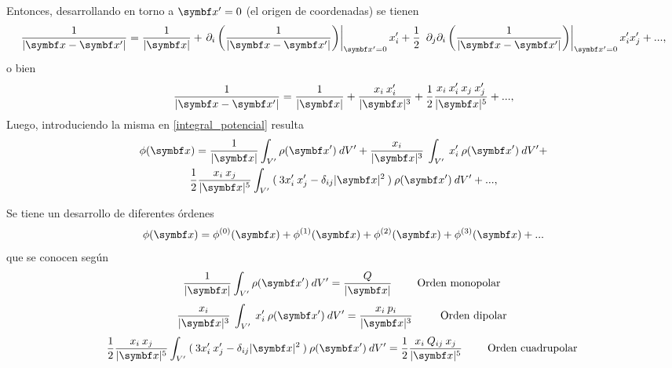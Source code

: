 \documentclass[10pt,oneside]{CBFT_book}
\begin{document}

Entonces, desarrollando en torno a $\vbx'=0$ (el origen de coordenadas) se tienen
\[
	\frac{ 1 }{| \vbx -\vbx' | } = 
	\frac{ 1 }{| \vbx |} + \left.\partial_i \left( \frac{ 1 }{| \vbx -\vbx' | } \right)\right|_{\vbx'=0} x_i' +
	\frac{1}{2} \: \left. \partial_j \partial_i \left( \frac{ 1 }{| \vbx -\vbx' | } \right)\right|_{\vbx'=0} x_i' x_j' + ...,
\]
o bien 
\[
	\frac{ 1 }{| \vbx -\vbx' | } = 
	\frac{ 1 }{| \vbx |} + \frac{x_i \: x_i'}{| \vbx |^3} +
	\frac{1}{2} \frac{ x_i \: x_i' \: x_j \: x_j' }{ | \vbx |^5 } + ...,	
\]
Luego, introduciendo la misma en \eqref{integral_potencial} resulta
\begin{multline*}
 	\phi(\vb{x}) =
	\frac{ 1 }{| \vbx |} \int_{V'} \rho( \vbx' ) \: dV' + 
	\frac{x_i }{| \vbx |^3} \: \int_{V'} \: x_i' \: \rho( \vbx' ) \: dV' + \\
	\frac{1}{2} \frac{ x_i  \: x_j  }{ | \vbx |^5 } 
	\int_{V'} \: (\: 3 x_i' \: x_j' - \delta_{ij}|\vbx|^2 \:) \: \rho( \vbx' ) \: dV' + ...,
\end{multline*}

Se tiene un desarrollo de diferentes órdenes 
\[
	\phi(\vb{x}) = \phi^{(0)}(\vbx) + \phi^{(1)}(\vbx) + \phi^{(2)}(\vbx) + \phi^{(3)}(\vbx) + ...
\]
que se conocen según
\[
	\frac{ 1 }{| \vbx |} \int_{V'} \rho( \vbx' ) \: dV' = \frac{ Q }{| \vbx |} \qquad \text{ Orden monopolar }
\]
\[
	\frac{x_i }{| \vbx |^3} \: \int_{V'} \: x_i' \: \rho( \vbx' ) \: dV' = 
	\frac{x_i \: p_i }{| \vbx |^3} \: \qquad \text{ Orden dipolar }
\]
\[
	\frac{1}{2} \frac{ x_i  \: x_j  }{ | \vbx |^5 } 
	\int_{V'} \: (\: 3 x_i' \: x_j' - \delta_{ij}|\vbx|^2 \:) \: \rho( \vbx' ) \: dV' =
	\frac{1}{2} \frac{ x_i  \: Q_{ij} \: x_j  }{ | \vbx |^5 } \qquad \text{ Orden cuadrupolar }
\]
\end{document}
